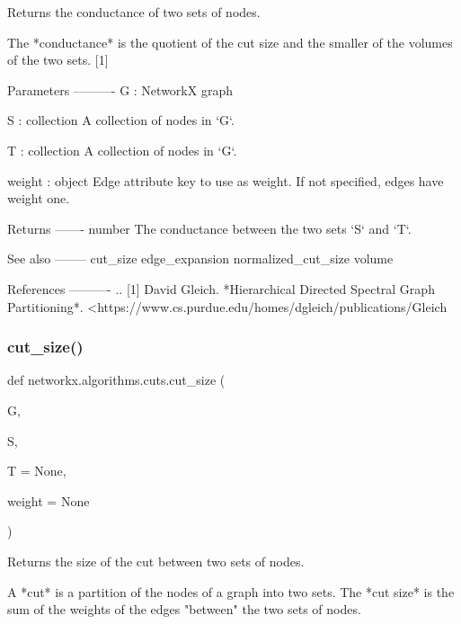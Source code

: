 \begin{DoxyVerb}Returns the conductance of two sets of nodes.

The *conductance* is the quotient of the cut size and the smaller of
the volumes of the two sets. [1]

Parameters
----------
G : NetworkX graph

S : collection
    A collection of nodes in `G`.

T : collection
    A collection of nodes in `G`.

weight : object
    Edge attribute key to use as weight. If not specified, edges
    have weight one.

Returns
-------
number
    The conductance between the two sets `S` and `T`.

See also
--------
cut_size
edge_expansion
normalized_cut_size
volume

References
----------
.. [1] David Gleich.
       *Hierarchical Directed Spectral Graph Partitioning*.
       <https://www.cs.purdue.edu/homes/dgleich/publications/Gleich%
 \mbox{\label{namespacenetworkx_1_1algorithms_1_1cuts_a3eab74cd6337e44432d794a0761b6440}} 
\subsubsection{\texorpdfstring{cut\+\_\+size()}{cut\_size()}}
{\footnotesize\ttfamily def networkx.\+algorithms.\+cuts.\+cut\+\_\+size (\begin{DoxyParamCaption}\item[{}]{G,  }\item[{}]{S,  }\item[{}]{T = {\ttfamily None},  }\item[{}]{weight = {\ttfamily None} }\end{DoxyParamCaption})}

\begin{DoxyVerb}Returns the size of the cut between two sets of nodes.

A *cut* is a partition of the nodes of a graph into two sets. The
*cut size* is the sum of the weights of the edges "between" the two
sets of nodes.


\end{DoxyVerb}
\end{DoxyVerb}
